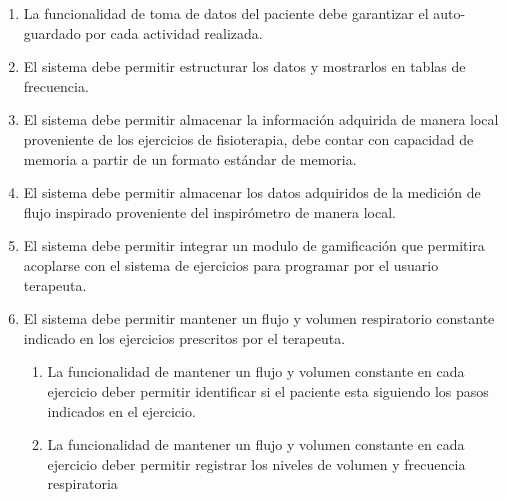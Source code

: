 \documentclass[12pt]{article}
\begin{document}
\begin{enumerate}[start=1,label={\bfseries RF0\arabic*.}]
\begin{enumerate}[label*=\arabic*.]
   
    
    
   
    \item La funcionalidad de toma de datos del paciente debe garantizar el auto-guardado por cada actividad realizada.
    
    \item El sistema debe permitir estructurar los datos y mostrarlos en tablas de frecuencia.
    
    \item El sistema debe permitir almacenar la información adquirida de manera local proveniente de los ejercicios de fisioterapia, debe contar con capacidad de memoria a partir de un formato estándar de memoria.
    
    \item El sistema debe permitir almacenar los datos adquiridos de la medición de flujo inspirado proveniente del inspirómetro de manera local.
    
  
    
    
    \item El sistema debe permitir integrar un modulo de gamificación que permitira acoplarse con el sistema de ejercicios para programar por el usuario terapeuta.
    
     
    
    \item El sistema debe permitir mantener un flujo y volumen respiratorio constante indicado en los ejercicios prescritos por el terapeuta.
    \label{RF01}
            \begin{enumerate}[label*=\arabic*.]
                \item La funcionalidad de mantener un flujo y volumen constante en cada ejercicio deber permitir identificar si el paciente esta siguiendo los pasos indicados en el ejercicio.%
                \item La funcionalidad de mantener un flujo y volumen constante en cada ejercicio deber permitir registrar los niveles de volumen y frecuencia respiratoria 
            \end{enumerate}
    

\end{enumerate}
\end{enumerate}
\end{document}
